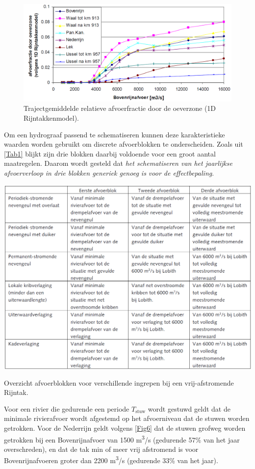 \begin{figure}
\includegraphics[width=\columnwidth]{figures/Fig2b.png}
\caption{Trajectgemiddelde relatieve afvoerfractie door de oeverzone (1D Rijntakkenmodel).}
\label{Fig2b}
\end{figure}

Om een hydrograaf passend te schematiseren kunnen deze karakteristieke waarden worden gebruikt om discrete afvoerblokken te onderscheiden.
Zoals uit \autoref{Tab1} blijkt zijn drie blokken daarbij voldoende voor een groot aantal maatregelen.
Daarom wordt gesteld dat \emph{het schematiseren van het jaarlijkse afvoerverloop in drie blokken generiek genoeg is voor de effectbepaling}.

\begin{table}
\includegraphics[width=\columnwidth]{figures/Tab1a.png}
\caption{Overzicht afvoerblokken voor verschillende ingrepen bij een vrij-afstromende Rijntak.}
\label{Tab1}
\end{table}

Voor een rivier die gedurende een periode $T_\text{stuw}$ wordt gestuwd geldt dat de minimale rivierafvoer wordt afgestemd op het afvoerniveau dat de stuwen worden getrokken.
Voor de Nederrijn geldt volgens \autoref{Fig6} dat de stuwen grofweg worden getrokken bij een Bovenrijnafvoer van 1500 m\textsuperscript{3}/s (gedurende 57\% van het jaar overschreden), en dat de tak min of meer vrij afstromend is voor Bovenrijnafvoeren groter dan 2200 m\textsuperscript{3}/s (gedurende 33\% van het jaar).

